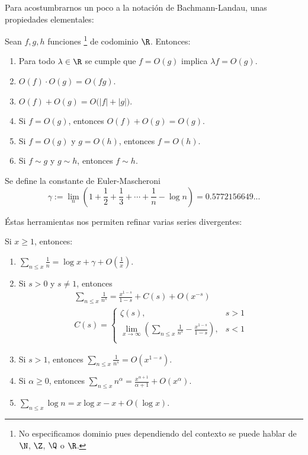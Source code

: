 \documentclass[teoria-numeros.tex]{subfiles}
\begin{document}
Para acostumbrarnos un poco a la notación de Bachmann-Landau, unas propiedades elementales:
\begin{prop}
	Sean $f, g, h$ funciones%
	\footnote{No especificamos dominio pues dependiendo del contexto se puede hablar de $\N$, $\Z$, $\Q$ o $\R$.} 
	de codominio $\R$. Entonces:
	\begin{enumerate}
		\item Para todo $\lambda\in\R$ se cumple que $f = O(g)$ implica $\lambda f = O(g)$.
		\item $O(f)\cdot O(g) = O(fg)$.
		\item $O(f) + O(g) = O\big( |f| + |g| \big)$.
		\item Si $f = O(g)$, entonces $O(f) + O(g) = O(g)$.
		\item Si $f = O(g)$ y $g = O(h)$, entonces $f = O(h)$.
		\item Si $f\sim g$ y $g\sim h$, entonces $f\sim h$.
	\end{enumerate}
\end{prop}

\begin{mydef}
	Se define la constante de Euler-Mascheroni
	$$ \gamma := \lim_n \left( 1 + \frac{1}{2} + \frac{1}{3} + \cdots + \frac{1}{n} - \log n \right) = 0.5772156649... $$
\end{mydef}

Éstas herramientas nos permiten refinar varias series divergentes:
\begin{thm}\label{thm:big-oh-calculus}
	Si $x\ge 1$, entonces:
	\begin{enumerate}
		\item $\displaystyle \sum_{n\le x} \frac{1}{n} = \log x + \gamma + O\left( \frac{1}{x} \right)$.
		\item Si $s > 0$ y $s\ne 1$, entonces
			\begin{gather*}
				\sum_{n\le x} \frac{1}{n^s} = \frac{x^{1-s}}{1-s} + C(s) + O(x^{-s}) \\
				C(s) =
				\begin{cases}
					\zeta(s), & s > 1 \\
					\displaystyle \lim_{x\to\infty} \left( \sum_{n\le x} \frac{1}{n^s} - \frac{x^{1-s}}{1-s} \right), & s < 1 \\
				\end{cases}
			\end{gather*}
		\item Si $s > 1$, entonces $\displaystyle \sum_{n\le x} \frac{1}{n^s} = O(x^{1-s})$.
		\item Si $\alpha \ge 0$, entonces $\displaystyle \sum_{n\le x} n^\alpha = \frac{x^{\alpha + 1}}{\alpha + 1} + O(x^\alpha)$.
		\item $\displaystyle \sum_{n\le x} \log n = x\log x - x + O(\log x) $.
	\end{enumerate}
\end{thm}
\end{document}

